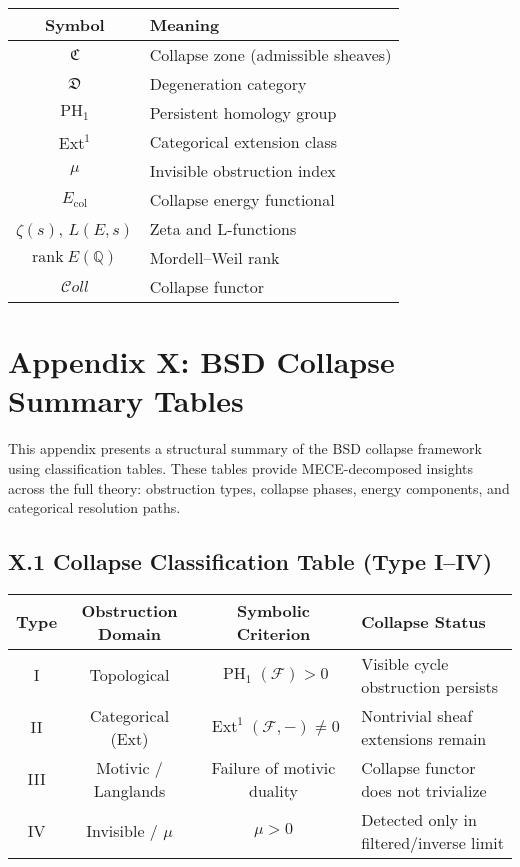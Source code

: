 \documentclass[11pt]{article}
\DeclareMathOperator{\Ext}{Ext}
\DeclareMathOperator{\PH}{PH}
\begin{document}
\begin{center}
\begin{tabular}{|c|l|}
\hline
Symbol & Meaning \\
\hline
\( \mathfrak{C} \) & Collapse zone (admissible sheaves) \\
\( \mathfrak{D} \) & Degeneration category \\
\( \PH_1 \) & Persistent homology group \\
\( \Ext^1 \) & Categorical extension class \\
\( \mu \) & Invisible obstruction index \\
\( E_{\mathrm{col}} \) & Collapse energy functional \\
\( \zeta(s) \), \( L(E, s) \) & Zeta and L-functions \\
\( \mathrm{rank}~E(\mathbb{Q}) \) & Mordell–Weil rank \\
\( \mathcal{C}oll \) & Collapse functor \\
\hline
\end{tabular}
\end{center}



\appendix
\section*{Appendix X: BSD Collapse Summary Tables}

This appendix presents a structural summary of the BSD collapse framework using classification tables. These tables provide MECE-decomposed insights across the full theory: obstruction types, collapse phases, energy components, and categorical resolution paths.

\subsection*{X.1 Collapse Classification Table (Type I–IV)}

\begin{center}
\begin{tabular}{|c|c|c|l|}
\hline
\textbf{Type} & \textbf{Obstruction Domain} & \textbf{Symbolic Criterion} & \textbf{Collapse Status} \\
\hline
I   & Topological        & \( \PH_1(\mathcal{F}) > 0 \)   & Visible cycle obstruction persists \\
II  & Categorical (Ext)  & \( \Ext^1(\mathcal{F}, -) \neq 0 \) & Nontrivial sheaf extensions remain \\
III & Motivic / Langlands & Failure of motivic duality   & Collapse functor does not trivialize \\
IV  & Invisible / \( \mu \)       & \( \mu > 0 \)               & Detected only in filtered/inverse limit \\
\hline
\end{tabular}
\end{center}
\end{document}
